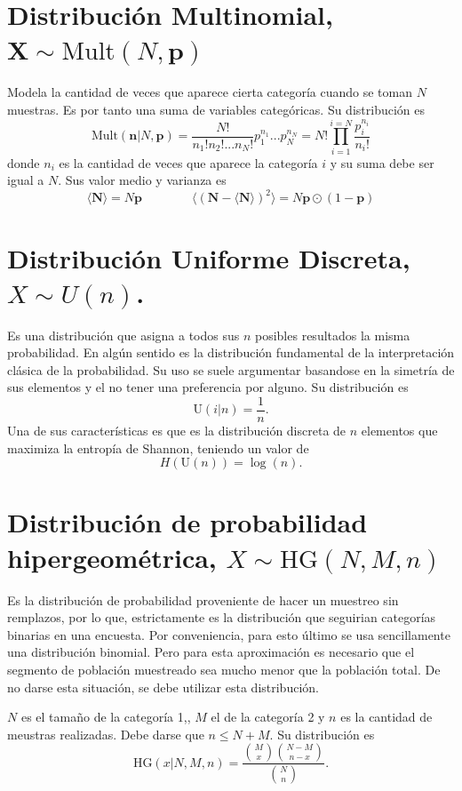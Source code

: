 \section{Distribuci\'on Multinomial, $\mathbf{X}\sim \text{Mult}(N,\mathbf{p})$}
Modela la cantidad de veces que aparece cierta categor\'ia cuando se toman $N$ muestras. Es por tanto una suma de variables categ\'oricas. Su distribuci\'on es
\begin{equation}
    \text{Mult}(\mathbf{n}|N,\mathbf{p}) = \frac{N!}{n_1!n_2!...n_N!}p_1^{n_1}...p_N^{n_N}=N!\prod_{i=1}^{i=N}\frac{p_i^{n_i}}{n_i!}
\end{equation}
donde $n_i$ es la cantidad de veces que aparece la categor\'ia $i$ y su suma debe ser igual a $N$. Sus valor medio y varianza es
\begin{equation}
    \langle \mathbf{N}\rangle =
    N\mathbf{p}
    \qquad
    \qquad
    \langle (\mathbf{N}-\langle \mathbf{N}\rangle)^2\rangle =
    N \mathbf{p}\odot (1-\mathbf{p})
\end{equation}
\section{Distribuci\'on Uniforme Discreta, $X\sim U(n)$.}
Es una distribuci\'on que asigna a todos sus $n$ posibles resultados la misma probabilidad. En alg\'un sentido es la distribuci\'on fundamental de la interpretaci\'on cl\'asica de la probabilidad. Su uso se suele argumentar basandose en la simetr\'ia de sus elementos y el no tener una preferencia por alguno. Su distribuci\'on es
\begin{equation}
    \text{U}(i|n) = \frac{1}{n}.
\end{equation}
Una de sus caracter\'isticas es que es la distribuci\'on discreta de $n$ elementos que maximiza la entrop\'ia de Shannon, teniendo un valor de 
\begin{equation}
    H(\text{U}(n)) = \log(n).
\end{equation}
\section{Distribuci\'on de probabilidad hipergeom\'etrica, $X\sim \text{HG}(N,M,n)$}
Es la distribuci\'on de probabilidad proveniente de hacer un muestreo sin remplazos, por lo que, estrictamente es la distribuci\'on que seguirian categor\'ias binarias en una encuesta. Por conveniencia, para esto \'ultimo se usa sencillamente una distribuci\'on binomial. Pero para esta aproximaci\'on es necesario que el segmento de poblaci\'on muestreado sea mucho menor que la poblaci\'on total. De no darse esta situaci\'on, se debe utilizar esta distribuci\'on.\par
$N$ es el tamaño de la categoría 1,, $M$ el de la categoría 2 y $n$ es la cantidad de meustras realizadas. Debe darse que $n\leq N+M$. Su distribuci\'on es
\begin{equation}
    \text{HG}(x|N,M,n) = \frac{\binom{M}{x}\binom{N-M}{n-x}}{\binom{N}{n}}.
\end{equation}
